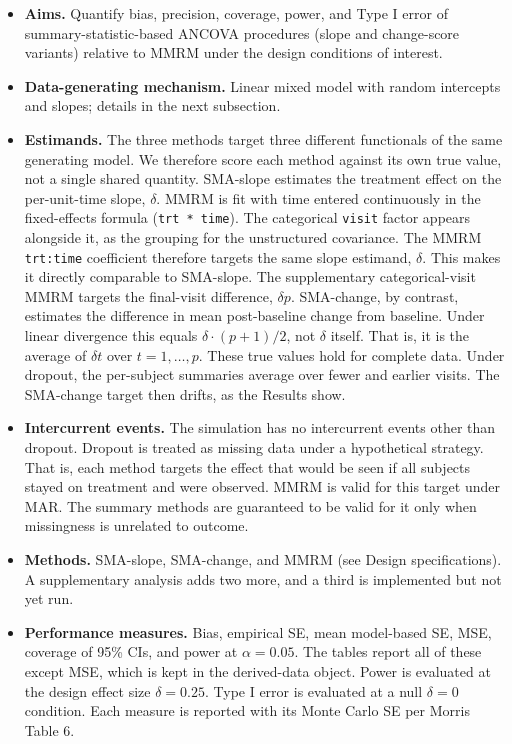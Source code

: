 \documentclass[
  11pt,
]{article}
\providecommand{\tightlist}{%
  \setlength{\itemsep}{0pt}\setlength{\parskip}{0pt}}
\begin{document}
\begin{itemize}
\tightlist
\item
  \textbf{Aims.} Quantify bias, precision, coverage, power, and Type I
  error of summary-statistic-based ANCOVA procedures (slope and
  change-score variants) relative to MMRM under the design
  conditions of interest.
\item
  \textbf{Data-generating mechanism.} Linear mixed model with random
  intercepts and slopes; details in the next subsection.
\item
  \textbf{Estimands.} The three methods target three different
  functionals of the same generating model. We therefore score
  each method against its own true value, not a single shared
  quantity. SMA-slope estimates the treatment
  effect on the per-unit-time slope, \(\delta\). MMRM is fit
  with time entered continuously in the fixed-effects formula
  (\texttt{trt\ *\ time}). The categorical \texttt{visit} factor appears
  alongside it, as the grouping for the unstructured
  covariance. The MMRM \texttt{trt:time} coefficient therefore
  targets the same slope estimand, \(\delta\). This makes it
  directly comparable to SMA-slope. The supplementary
  categorical-visit MMRM targets the final-visit difference,
  \(\delta p\). SMA-change, by
  contrast, estimates the difference in mean post-baseline
  change from baseline. Under linear divergence this equals
  \(\delta \cdot (p + 1) / 2\), not \(\delta\) itself. That is,
  it is the average of \(\delta t\) over \(t = 1, \dots, p\). These
  true values hold for complete data. Under dropout, the
  per-subject summaries average over fewer and earlier visits.
  The SMA-change target then drifts, as the Results show.
\item
  \textbf{Intercurrent events.} The simulation has no intercurrent
  events other than dropout. Dropout is treated as missing
  data under a hypothetical strategy. That is, each method
  targets the effect that would be seen if all subjects stayed
  on treatment and were observed. MMRM is valid for this target
  under MAR. The summary methods are guaranteed to be valid for
  it only when missingness is unrelated to outcome.
\item
  \textbf{Methods.} SMA-slope, SMA-change, and MMRM (see Design
  specifications). A supplementary analysis adds two more, and a
  third is implemented but not yet run.
\item
  \textbf{Performance measures.} Bias, empirical SE, mean model-based
  SE, MSE, coverage of 95\% CIs, and power at \(\alpha = 0.05\).
  The tables report all of these except MSE, which is kept in
  the derived-data object. Power is
  evaluated at the design effect size \(\delta = 0.25\). Type I
  error is evaluated at a null \(\delta = 0\) condition. Each
  measure is reported with its Monte Carlo SE per Morris
  Table 6.
\end{itemize}
\end{document}
